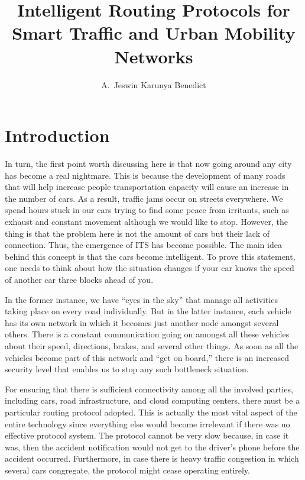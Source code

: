 \documentclass[12pt]{article}
\title{Intelligent Routing Protocols for Smart Traffic and Urban Mobility Networks}
\author{A.~Jeswin Karunya Benedict\\}
\date{}
\begin{document}
\maketitle




\section{Introduction}

In turn, the first point worth discussing here is that now going around any city has become a real nightmare. This is because the development of many roads that will help increase people transportation capacity will cause an increase in the number of cars. As a result, traffic jams occur on streets everywhere. We spend hours stuck in our cars trying to find some peace from irritants, such as exhaust and constant movement although we would like to stop. However, the thing is that the problem here is not the amount of cars but their lack of connection.
Thus, the emergence of ITS has become possible. The main idea behind this concept is that the cars become intelligent. To prove this statement, one needs to think about how the situation changes if your car knows the speed of another car three blocks ahead of you.

In the former instance, we have “eyes in the sky” that manage all activities taking place on every road individually. But in the latter instance, each vehicle has its own network in which it becomes just another node amongst several others. There is a constant communication going on amongst all these vehicles about their speed, directions, brakes, and several other things. As soon as all the vehicles become part of this network and “get on board,” there is an increased security level that enables us to stop any such bottleneck situation.

For ensuring that there is sufficient connectivity among all the involved parties, including cars, road infrastructure, and cloud computing centers, there must be a particular routing protocol adopted. This is actually the most vital aspect of the entire technology since everything else would become irrelevant if there was no effective protocol system. The protocol cannot be very slow because, in case it was, then the accident notification would not get to the driver's phone before the accident occurred. Furthermore, in case there is heavy traffic congestion in which several cars congregate, the protocol might cease operating entirely.
\end{document}
